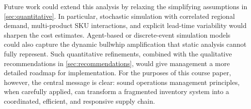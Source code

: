 \documentclass[12pt,a4paper]{article}
\begin{document}
Future work could extend this analysis by relaxing the simplifying assumptions in \cref{sec:quantitative}. In particular, stochastic simulation with correlated regional demand, multi-product SKU interactions, and explicit lead-time variability would sharpen the cost estimates. Agent-based or discrete-event simulation models could also capture the dynamic bullwhip amplification that static analysis cannot fully represent. Such quantitative refinements, combined with the qualitative recommendations in \cref{sec:recommendations}, would give management a more detailed roadmap for implementation. For the purposes of this course paper, however, the central message is clear: sound operations management principles, when carefully applied, can transform a fragmented inventory system into a coordinated, efficient, and responsive supply chain.




\end{document}
